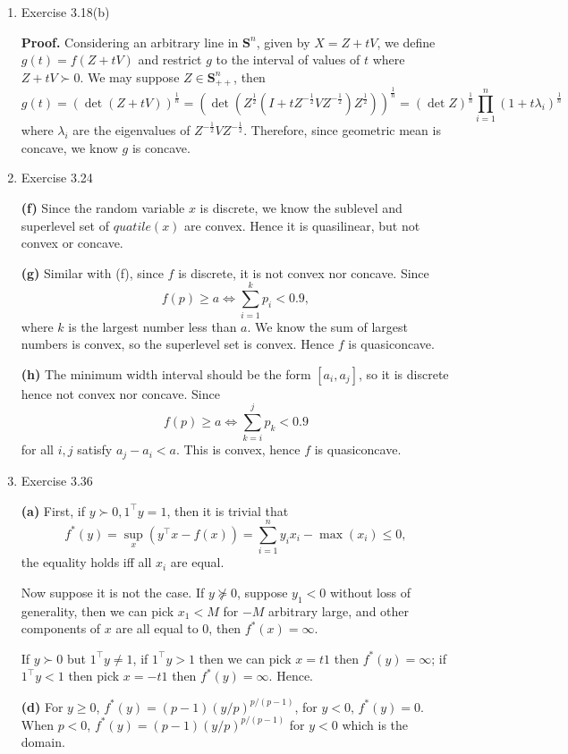 \documentclass{article}%
\begin{document}
\begin{enumerate}
\item Exercise 3.18(b)

\textbf{Proof.} Considering an arbitrary line in $\textbf{S}^n $, given by $X = Z + tV$, we define $g(t) = f(Z+tV)$ and restrict $g$ to the interval of values of $t$ where $Z+tV \succ 0$. We may suppose $Z\in \textbf{S}_{++}^n $, then
$$
g(t) = (\det(Z+tV))^{\frac{1}{n}} = (\det(Z^\frac{1}{2}(I+tZ^{-\frac{1}{2}}VZ^{-\frac{1}{2}})Z^\frac{1}{2}))^\frac{1}{n} = (\det Z)^\frac{1}{n}\prod_{i=1}^{n}(1+t\lambda_i)^\frac{1}{n}
$$
where $\lambda_i $ are the eigenvalues of $Z^{-\frac{1}{2}}VZ^{-\frac{1}{2}} $. Therefore, since geometric mean is concave, we know $g$ is concave.

\item Exercise 3.24

\textbf{(f)} Since the random variable $x$ is discrete, we know the sublevel and superlevel set of $quatile(x)$ are convex. Hence it is quasilinear, but not convex or concave.

\textbf{(g)} Similar with (f), since $f$ is discrete, it is not convex nor concave. Since
$$
f(p) \ge a \iff \sum_{i=1}^{k}p_i < 0.9,
$$
where $k$ is the largest number less than $a$. We know the sum of largest numbers is convex, so the superlevel set is convex. Hence $f$ is quasiconcave.

\textbf{(h)} The minimum width interval should be the form $[a_i, a_j]$, so it is discrete hence not convex nor concave. Since
$$
f(p) \ge a \iff \sum_{k=i}^{j}p_k < 0.9
$$
for all $i, j$ satisfy $a_j-a_i < a $. This is convex, hence $f$ is quasiconcave.

\item Exercise 3.36

\textbf{(a)} First, if $y\succ 0, 1^\top y = 1 $, then it is trivial that 
$$
f^*(y) = \sup_{x}(y^\top x-f(x)) = \sum_{i=1}^{n}y_ix_i - \max(x_i) \le 0,
$$
the equality holds iff all $x_i $ are equal. 

Now suppose it is not the case. If $y \nsucceq 0$, suppose $y_1 < 0 $ without loss of generality, then we can pick $x_1 < M$ for $-M$ arbitrary large, and other components of $x$ are all equal to 0, then $f^*(x) = \infty $. 

If $y\succ 0 $ but $1^\top y \ne 1 $, if $1^\top y > 1$ then we can pick $x = t1$ then $f^*(y) = \infty $; if $1^\top y < 1$ then pick $x = -t1$ then $f^*(y) = \infty $. Hence.

\textbf{(d)} For $y\ge 0$, $f^*(y) = (p-1)(y/p)^{p/(p-1)} $, for $y < 0$, $f^*(y) = 0 $. When $p < 0$, $f^*(y) = (p-1)(y/p)^{p/(p-1)} $ for $y < 0$ which is the domain.


\end{enumerate}
\end{document}
